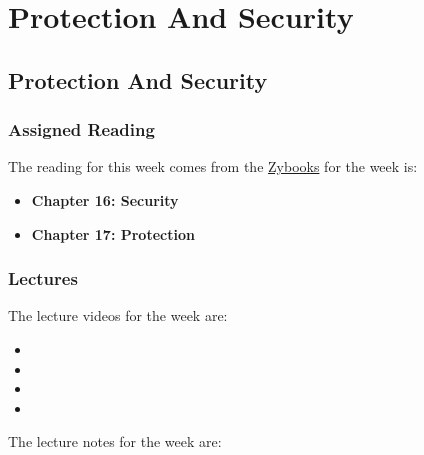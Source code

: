 \clearpage

\renewcommand{\ChapTitle}{Protection And Security}
\renewcommand{\SectionTitle}{Protection And Security}

\chapter{\ChapTitle}
\section{\SectionTitle}

\subsection{Assigned Reading}

The reading for this week comes from the \href{https://learn.zybooks.com/zybook/COLORADOCSPB3753KnoxFall2024}{Zybooks} for the week is:

\begin{itemize}
    \item \textbf{Chapter 16: Security}
    \item \textbf{Chapter 17: Protection}
\end{itemize}

\subsection{Lectures}

The lecture videos for the week are:

\begin{itemize}
    \item {}
    \item {}
    \item {}
    \item {}
\end{itemize}

\noindent The lecture notes for the week are:

